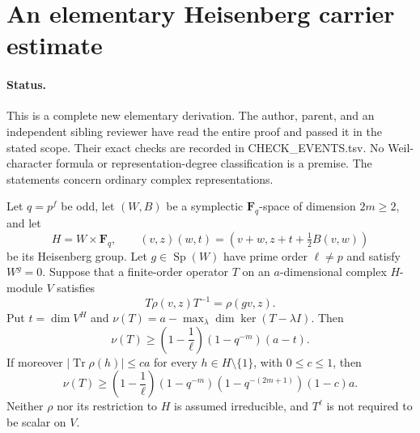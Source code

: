 \section{An elementary Heisenberg carrier estimate}
\label{sec:heisenberg-carrier}

\paragraph{Status.}
This is a complete new elementary derivation. The author, parent,
and an independent sibling reviewer have read the entire proof and
passed it in the stated scope. Their exact checks are recorded in
CHECK\_EVENTS.tsv. No Weil-character formula or representation-degree
classification is a premise.
The statements concern ordinary complex representations.

\begin{lemma}
\label{D-HOS-01}
Let $q=p^f$ be odd, let $(W,B)$ be a symplectic
$\mathbf F_q$-space of dimension $2m\ge2$, and let
\[
 H=W\times\mathbf F_q,\qquad
 (v,z)(w,t)=(v+w,z+t+\tfrac12 B(v,w))
                                                               \tag{HOS.1}
\]
be its Heisenberg group. Let $g\in\operatorname{Sp}(W)$ have
prime order $\ell\ne p$ and satisfy $W^g=0$. Suppose that a
finite-order operator $T$ on an $a$-dimensional complex
$H$-module $V$ satisfies
\[
 T\rho(v,z)T^{-1}=\rho(gv,z).
                                                               \tag{HOS.2}
\]
Put $t=\dim V^H$ and
$\nu(T)=a-\max_\lambda\dim\ker(T-\lambda I)$. Then
\[
 \nu(T)\ge
 \left(1-\frac1\ell\right)(1-q^{-m})(a-t).
                                                               \tag{HOS.3}
\]
If moreover $|\operatorname{Tr}\rho(h)|\le ca$ for every
$h\in H\setminus\{1\}$, with $0\le c\le1$, then
\[
 \nu(T)\ge
 \left(1-\frac1\ell\right)(1-q^{-m})
       (1-q^{-(2m+1)})(1-c)a.
                                                               \tag{HOS.4}
\]
Neither $\rho$ nor its restriction to $H$ is assumed irreducible,
and $T^\ell$ is not required to be scalar on $V$.
\end{lemma}

